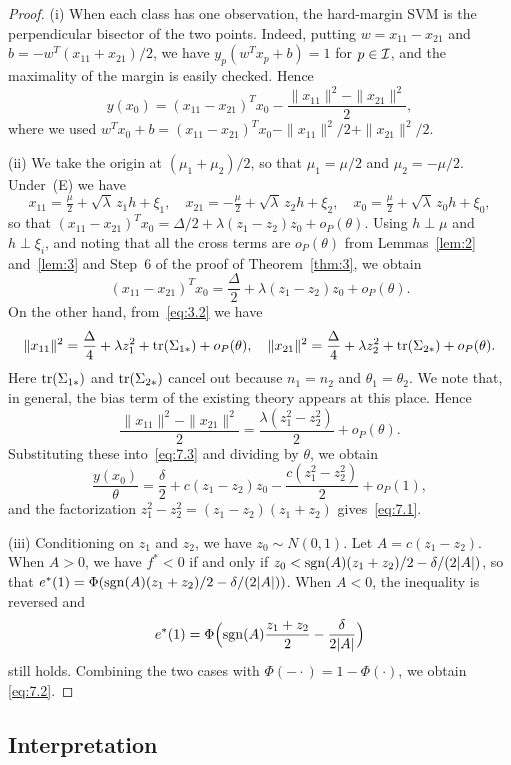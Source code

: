 \begin{proof}
(i) When each class has one observation, the hard-margin SVM is the perpendicular
bisector of the two points. Indeed, putting $w=x_{11}-x_{21}$ and
$b=-w^T(x_{11}+x_{21})/2$, we have $y_p(w^Tx_p+b)=1$ for $p\in\mathcal{I}$, and the
maximality of the margin is easily checked. Hence
\begin{equation}
y(x_0)=(x_{11}-x_{21})^Tx_0-\frac{\|x_{11}\|^2-\|x_{21}\|^2}{2},
\label{eq:7.3}
\end{equation}
where we used $w^Tx_0+b=(x_{11}-x_{21})^Tx_0-\|x_{11}\|^2/2+\|x_{21}\|^2/2$.

(ii) We take the origin at $(\mu_1+\mu_2)/2$, so that $\mu_1=\mu/2$ and
$\mu_2=-\mu/2$. Under~(E) we have
\[
x_{11}=\tfrac{\mu}{2}+\sqrt{\lambda}\,z_1 h+\xi_1,\quad
x_{21}=-\tfrac{\mu}{2}+\sqrt{\lambda}\,z_2 h+\xi_2,\quad
x_0=\tfrac{\mu}{2}+\sqrt{\lambda}\,z_0 h+\xi_0,
\]
so that $(x_{11}-x_{21})^Tx_0=\Delta/2+\lambda(z_1-z_2)z_0+o_P(\theta)$. Using
$h\perp\mu$ and $h\perp\xi_i$, and noting that all the cross terms are $o_P(\theta)$
from Lemmas~\ref{lem:2} and~\ref{lem:3} and Step~6 of the proof of
Theorem~\ref{thm:3}, we obtain
\[
(x_{11}-x_{21})^Tx_0=\frac{\Delta}{2}+\lambda(z_1-z_2)z_0+o_P(\theta).
\]
On the other hand, from~\eqref{eq:3.2} we have
\[
\|x_{11}\|^2=\frac{\Delta}{4}+\lambda z_1^2+\operatorname{tr}(\Sigma_{1*})+o_P(\theta),\quad
\|x_{21}\|^2=\frac{\Delta}{4}+\lambda z_2^2+\operatorname{tr}(\Sigma_{2*})+o_P(\theta).
\]
Here $\operatorname{tr}(\Sigma_{1*})$ and $\operatorname{tr}(\Sigma_{2*})$ cancel out because $n_1=n_2$ and
$\theta_1=\theta_2$. We note that, in general, the bias term of the existing theory
appears at this place. Hence
\[
\frac{\|x_{11}\|^2-\|x_{21}\|^2}{2}=\frac{\lambda(z_1^2-z_2^2)}{2}+o_P(\theta).
\]
Substituting these into~\eqref{eq:7.3} and dividing by $\theta$, we obtain
\[
\frac{y(x_0)}{\theta}
=\frac{\delta}{2}+c(z_1-z_2)z_0-\frac{c(z_1^2-z_2^2)}{2}+o_P(1),
\]
and the factorization $z_1^2-z_2^2=(z_1-z_2)(z_1+z_2)$ gives~\eqref{eq:7.1}.

(iii) Conditioning on $z_1$ and $z_2$, we have $z_0\sim N(0,1)$. Let
$A=c(z_1-z_2)$. When $A>0$, we have $f^*<0$ if and only if
$z_0<\operatorname{sgn}(A)(z_1+z_2)/2-\delta/(2|A|)$, so that
$e^*(1)=\Phi(\operatorname{sgn}(A)(z_1+z_2)/2-\delta/(2|A|))$. When $A<0$, the inequality is
reversed and
\[
e^*(1)=\Phi\Bigl(\operatorname{sgn}(A)\frac{z_1+z_2}{2}-\frac{\delta}{2|A|}\Bigr)
\]
still holds. Combining the two cases with $\Phi(-\cdot)=1-\Phi(\cdot)$, we obtain
\eqref{eq:7.2}.
\end{proof}

\subsection{Interpretation}

